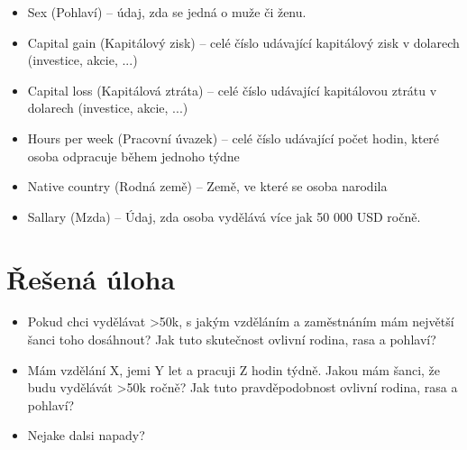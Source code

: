 \documentclass[11pt,a4paper,titlepage]{article}
\begin{document}
\begin{itemize}
                \item Sex (Pohlaví) -- údaj, zda se jedná o muže či ženu.
                \item Capital gain (Kapitálový zisk) -- celé číslo udávající kapitálový zisk v dolarech (investice, akcie, ...)
                \item Capital loss (Kapitálová ztráta) -- celé číslo udávající kapitálovou ztrátu v dolarech (investice, akcie, ...)
                \item Hours per week (Pracovní úvazek) -- celé číslo udávající počet hodin, které osoba odpracuje během jednoho týdne
                \item Native country (Rodná země) -- Země, ve které se osoba narodila
                \item Sallary (Mzda) -- Údaj, zda osoba vydělává více jak 50 000 USD ročně.
            \end{itemize}
    
    \section{Řešená úloha}    
    \begin{itemize}
        \item Pokud chci vydělávat >50k, s jakým vzděláním a zaměstnáním mám největší šanci toho dosáhnout? Jak tuto skutečnost ovlivní rodina, rasa a pohlaví?
        \item Mám vzdělání X, jemi Y let a pracuji Z hodin týdně. Jakou mám šanci, že budu vydělávát >50k ročně? Jak tuto pravděpodobnost ovlivní rodina, rasa a pohlaví?
        \item Nejake dalsi napady?
    \end{itemize}
\end{document}
